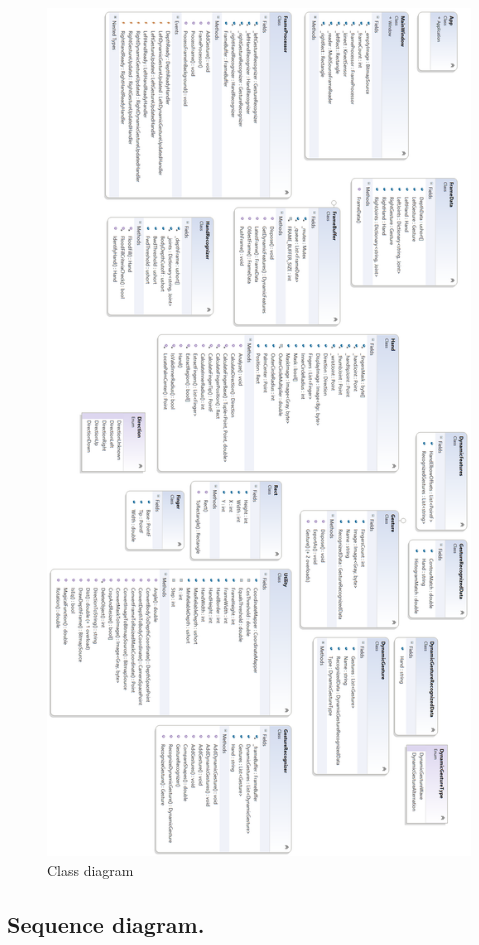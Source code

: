 \documentclass[a4paper,11pt,oneside]{article}
\begin{document}
\begin{figure}[H]
\centering
\includegraphics[scale=0.38]{class-diagram.png}
\caption{Class diagram}
\end{figure}

\newpage
\subsection{Sequence diagram.}
\end{document}
